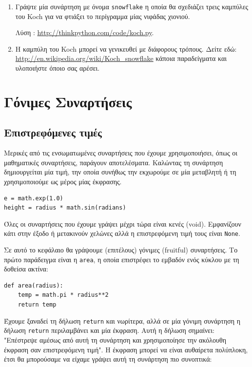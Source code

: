 \documentclass[10pt]{book}
\begin{document}
\begin{exercise}
\begin{enumerate}
\item Γράψτε μία συνάρτηση με όνομα  {\tt snowflake}  η οποία θα σχεδιάζει
τρεις καμπύλες του  Koch  για να φτιάξει το περίγραμμα μίας νιφάδας χιονιού.

Λύση : \url{http://thinkpython.com/code/koch.py}.

\item Η καμπύλη του Koch μπορεί να γενικευθεί με διάφορους τρόπους.
Δείτε εδώ: \url{http://en.wikipedia.org/wiki/Koch_snowflake}  κάποια
παραδείγματα και υλοποιήστε όποιο σας αρέσει.

\end{enumerate}

\end{exercise}

\chapter{Γόνιμες Συναρτήσεις}
\label{fruitchap}

\section{Επιστρεφόμενες τιμές}

Μερικές από τις ενσωματωμένες συναρτήσεις που έχουμε χρησιμοποιήσει, όπως οι
μαθηματικές συναρτήσεις, παράγουν αποτελέσματα. Καλώντας τη συνάρτηση δημιουργείται μία τιμή, την οποία συνήθως την εκχωρούμε σε μία μεταβλητή ή τη χρησιμοποιούμε ως μέρος
μίας έκφρασης.

\begin{verbatim}
e = math.exp(1.0)
height = radius * math.sin(radians)
\end{verbatim}
%

Όλες οι συναρτήσεις που έχουμε γράψει μέχρι τώρα είναι κενές  (void). 
Εμφανίζουν κάτι στην έξοδο ή μετακινούν χελώνες αλλά η επιστρεφόμενη τιμή τους
είναι {\tt None}. 

Σε αυτό το κεφάλαιο θα γράψουμε (επιτέλους) γόνιμες (fruitful) συναρτήσεις.
Το πρώτο παράδειγμα είναι η {\tt area}, η οποία επιστρέφει το εμβαδόν ενός κύκλου με τη δοθείσα ακτίνα:

\begin{verbatim}
def area(radius):
    temp = math.pi * radius**2
    return temp
\end{verbatim}
%

Έχουμε ξαναδεί τη δήλωση {\tt return} και νωρίτερα, αλλά σε μία γόνιμη
συνάρτηση η δήλωση {\tt return} περιλαμβάνει και μία έκφραση. Αυτή η δήλωση σημαίνει: "Επέστρεψε αμέσως από αυτή τη συνάρτηση και χρησιμοποίησε την ακόλουθη έκφραση σαν επιστρεφόμενη τιμή". Η έκφραση μπορεί να είναι αυθαίρετα πολύπλοκη, έτσι θα μπορούσαμε να είχαμε γράψει αυτή τη συνάρτηση πιο συνοπτικά:
\end{document}
